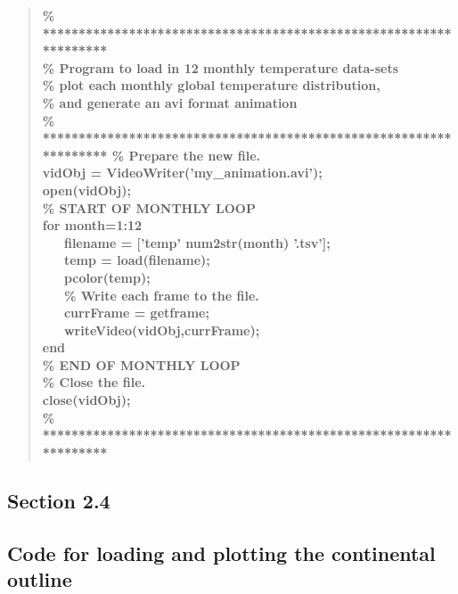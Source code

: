 \documentclass{tufte-book} %
\newenvironment{docspecbold}{\begin{quotation}\ttfamily\bfseries\parskip0pt\parindent0pt\ignorespaces}{\end{quotation}}
\begin{document}
\begin{docspecbold}
\textcolor[rgb]{0,0.501961,0}{\% ****************************************************************** 
\\\% Program to load in 12 monthly temperature data-sets
\\\% plot each monthly global temperature distribution,
\\\% and generate an avi format animation
\\\% ******************************************************************}
\textcolor[rgb]{0,0.501961,0}{\% Prepare the new file.}\\
vidObj = VideoWriter(\textcolor[rgb]{1,0,1}{'my\_animation.avi'});\\
open(vidObj);\\
\textcolor[rgb]{0,0.501961,0}{\% START OF MONTHLY LOOP}\\
for month=1:12\\
\ \ \ filename = [\textcolor[rgb]{1,0,1}{'temp'} num2str(month) \textcolor[rgb]{1,0,1}{'.tsv'}];\\
\ \ \ temp = load(filename);\\
\ \ \ pcolor(temp);\\
\ \ \ \textcolor[rgb]{0,0.501961,0}{\% Write each frame to the file.}\\
\ \ \ currFrame = getframe;\\
\ \ \ writeVideo(vidObj,currFrame);\\
end\\
\textcolor[rgb]{0,0.501961,0}{\% END OF MONTHLY LOOP}\\
\textcolor[rgb]{0,0.501961,0}{\% Close the file.}\\
close(vidObj);\\
\textcolor[rgb]{0,0.501961,0}{\% ****************************************************************** }
\end{docspecbold}

%
\newpage

\subsection*{\textbf{Section 2.4}}

\subsection*{Code for loading and plotting the continental outline}
\end{document}
